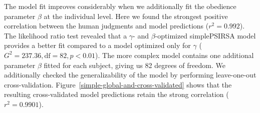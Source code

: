 \documentclass[10pt,a4paper]{article}
\begin{document}

 

The model fit improves considerably when we additionally fit the obedience parameter $\beta$ at the individual level. 
Here we found the strongest positive correlation between the human judgments and model predictions ($r^2 = 0.992$). The likelihood ratio test revealed that a $\gamma$- and $\beta$-optimized simplePSIRSA model provides a better fit compared to a model optimized only for $\gamma$ ($G^2 = 237.36, \textrm{df} = 82, p < 0.01$). The more complex model contains one additional parameter $\beta$ fitted for each subject, giving us 82 degrees of freedom. We additionally checked the generalizability of the model by performing leave-one-out cross-validation. Figure~\ref{simple-global-and-cross-validated} shows that the resulting cross-validated model predictions retain the strong correlation ($r^{2}=0.9901$).

\end{document}
